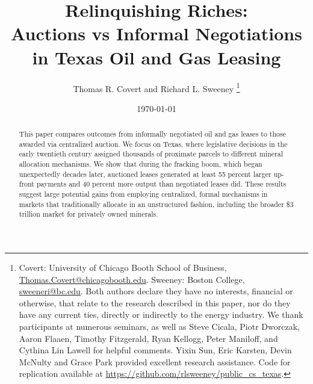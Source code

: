 \documentclass[AER,finalmode]{AEA}
\begin{document}
\title{Relinquishing Riches: \\ Auctions vs Informal Negotiations \\ in Texas Oil and Gas Leasing}

\author{Thomas R. Covert and Richard L. Sweeney \thanks{Covert: University of Chicago Booth School of Business, \protect\href{mailto:Thomas.Covert@chicagobooth.edu}{Thomas.Covert@chicagobooth.edu}. Sweeney: Boston College, \protect\href{mailto:sweeneri@bc.edu}{sweeneri@bc.edu}. Both authors declare they have no interests, financial or otherwise, that relate to the research described in this paper, nor do they have any current ties, directly or indirectly to the energy industry. We thank participants at numerous seminars, as well as Steve Cicala, Piotr Dworczak, Aaron Flaaen, Timothy Fitzgerald, Ryan Kellogg, Peter Maniloff, and Cythina Lin Lawell for helpful comments.  Yixin Sun, Eric Karsten, Devin McNulty and Grace Park provided excellent research assistance. Code for replication available at \href{https://github.com/rlsweeney/public_cs_texas}{https://github.com/rlsweeney/public\_cs\_texas}.}}

\date{\today}
\begin{abstract}
This paper compares outcomes from informally negotiated oil and gas leases to those awarded via centralized auction. We focus on Texas, where legislative decisions in the early twentieth century assigned thousands of proximate parcels to different mineral allocation mechanisms. We show that during the fracking boom, which began unexpectedly decades later, auctioned leases generated at least 55 percent larger up-front payments and 40 percent more output than negotiated leases did.  These results suggest large potential gains from employing centralized, formal mechanisms in markets that traditionally allocate in an unstructured fashion, including the broader \$3 trillion market for privately owned minerals.
\end{abstract}
\maketitle



\end{document}
